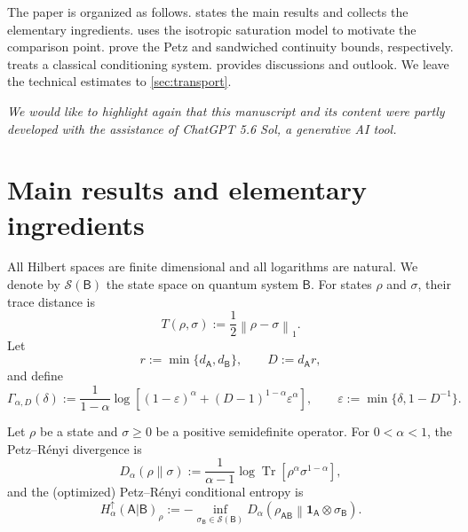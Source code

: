 \documentclass[11pt,reqno]{amsart}
\theoremstyle{definition}
\DeclareMathOperator{\Tr}{Tr}
\newcommand{\I}{\mathbf 1}
\newcommand{\A}{\mathsf{A}}
\newcommand{\B}{\mathsf{B}}
\newcommand{\states}[1]{\mathcal{S}(#1)}
\newcommand{\norm}[1]{\left\lVert#1\right\rVert}
\begin{document}
The paper is organized as follows.
 states the main results and collects the elementary
ingredients.   uses the isotropic saturation model
to motivate the comparison point.
 prove the Petz and sandwiched
continuity bounds, respectively.
 treats a classical conditioning system.
 provides discussions and outlook.
We leave the technical estimates to  \cref{sec:transport}.

\medskip
\emph{We would like to highlight again that this manuscript and its content were partly developed with the assistance
	of ChatGPT 5.6 Sol, a generative AI tool.
}


\section{Main results and elementary ingredients}\label{sec:preliminaries}

All Hilbert spaces are finite dimensional and all logarithms are natural.
We denote by $\mathcal{S}(\B)$ the state space on quantum system $\B$.
For
states $\rho$ and $\sigma$, their trace distance is
\begin{equation}\label{eq:trace-distance}
 T(\rho,\sigma):=\frac12\norm{\rho-\sigma}_1.
\end{equation}
Let
\begin{equation}
 r:=\min\{d_{\A},d_{\B}\},
 \qquad
 D:=d_{\A}r,
 \label{eq:rD}
\end{equation}
and define
\begin{equation}
 \Gamma_{\alpha,D}(\delta)
 :=\frac{1}{1-\alpha}
 \log\!\left[(1-\varepsilon)^{\alpha}+(D-1)^{1-\alpha}\varepsilon^{\alpha}\right],
 \qquad
 \varepsilon:=\min\{\delta,1-D^{-1}\}.
 \label{eq:Gamma}
\end{equation}

Let $\rho$ be a state and $\sigma\geq 0$ be a positive semidefinite operator.
For $0<\alpha<1$, the Petz--R\'enyi divergence \cite{Pet86} is
\begin{equation}\label{eq:Petz-divergence}
 D_\alpha(\rho\|\sigma)
 :=\frac{1}{\alpha-1}\log\Tr[\rho^\alpha\sigma^{1-\alpha}],
\end{equation}
and the (optimized) Petz--R\'enyi conditional entropy is
\begin{equation}\label{eq:conditional-entropy}
 H_\alpha^\uparrow(\A|\B)_\rho
 :=-\inf_{\sigma_{\B}\in\states{\B}}
 D_\alpha\!\left(\rho_{\A\B}\middle\|\I_{\A}\otimes\sigma_{\B}\right).
\end{equation}
\end{document}
